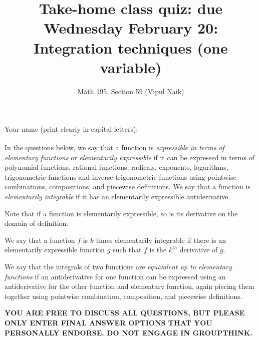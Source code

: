 \documentclass[10pt]{amsart}
\title{Take-home class quiz: due Wednesday February 20: Integration techniques (one variable)}
\author{Math 195, Section 59 (Vipul Naik)}
\begin{document}
\maketitle

Your name (print clearly in capital letters): $\underline{\qquad\qquad\qquad\qquad\qquad\qquad\qquad\qquad\qquad\qquad}$

In the questions below, we say that a function is {\em expressible in
terms of elementary functions} or {\em elementarily expressible} if it
can be expressed in terms of polynomial functions, rational functions,
radicals, exponents, logarithms, trigonometric functions and inverse
trigonometric functions using pointwise combinations, compositions,
and piecewise definitions. We say that a function is {\em elementarily
integrable} if it has an elementarily expressible antiderivative.

Note that if a function is elementarily expressible, so is its
derivative on the domain of definition.

We say that a function $f$ is $k$ times elementarily integrable if
there is an elementarily expressible function $g$ such that $f$ is the
$k^{th}$ derivative of $g$.

We say that the integrals of two functions are {\em equivalent up to
elementary functions} if an antiderivative for one function can be
expressed using an antiderivative for the other function and
elementary function, again piecing them together using pointwise
combination, composition, and piecewise definitions.

{\bf YOU ARE FREE TO DISCUSS ALL QUESTIONS, BUT PLEASE ONLY ENTER
FINAL ANSWER OPTIONS THAT YOU PERSONALLY ENDORSE. DO NOT ENGAGE IN
GROUPTHINK.}
\end{document}
